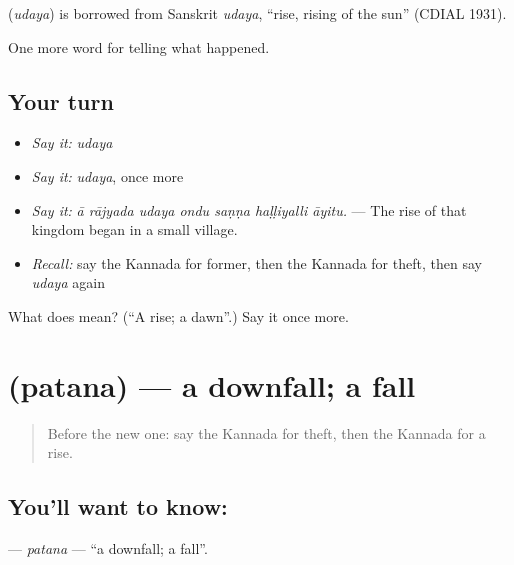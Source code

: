\begin{cousinweb}
\textbf{} (\emph{udaya}) is borrowed from Sanskrit \emph{udaya}, \textquotedblleft{}rise, rising of the sun\textquotedblright{} (CDIAL 1931).
\end{cousinweb}

\begin{grammarlens}[title={What you've built}]
One more word for telling what happened.
\end{grammarlens}

\subsection*{Your turn}
\begin{itemize}
\raggedright
  \item \emph{Say it:} \emph{udaya}
  \item \emph{Say it:} \emph{udaya}, once more
  \item \emph{Say it:} \emph{ā rājyada udaya ondu saṇṇa haḷḷiyalli āyitu.} — The rise of that kingdom began in a small village.
  \item \emph{Recall:} say the Kannada for former, then the Kannada for theft, then say \emph{udaya} again
\end{itemize}

\begin{tcolorbox}[breakable,colback=teal!4,colframe=teal!35!black,title={Before you move on}]
What does  mean? (\textquotedblleft{}A rise; a dawn\textquotedblright{}.) Say it once more.
\end{tcolorbox}
\section[\texorpdfstring{\kn{ಪತನ} (patana)}{ಪತನ (patana)}]{ (patana) — a downfall; a fall}

\label{lesson:KA-C373-patana}



\begin{quote}
Before the new one: say the Kannada for theft, then the Kannada for a rise.
\end{quote}

\subsection*{You'll want to know: }
\textbf{} — \emph{patana} — \textquotedblleft{}a downfall; a fall\textquotedblright{}.

